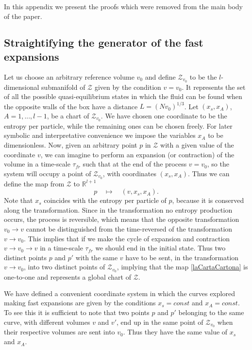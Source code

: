 \documentclass[useAMS,usenatbib,prd,twocolumn,nofootinbib]{revtex4-1}
\begin{document}
In this appendix we present the proofs which were removed from the main body of the paper.

\subsection{Straightifying the generator of the fast expansions}\label{STGOTFE}

Let us choose an arbitrary reference volume $v_0$ and define $\mathcal{Z}_{v_0}$ to be the $l$-dimensional submanifold of $\mathcal{Z}$ given by the condition $v=v_0$. It represents the set of all the possible quasi-equilibrium states in which the fluid can be found when the opposite walls of the box have a distance $L=(Nv_0)^{1/3}$. Let $(x_s,x_A)$, $A=1,...,l-1$, be a chart of $\mathcal{Z}_{v_0}$. We have chosen one coordinate to be the entropy per particle, while the remaining ones can be chosen freely. For later symbolic and interpretative convenience we impose the variables $x_A$ to be dimensionless. 
Now, given an arbitrary point $p$ in $\mathcal{Z}$ with a given value of the coordinate $v$, we can imagine to perform an expansion (or contraction) of the volume in a time-scale $\tau_{fr}$ such that at the end of the process $v=v_0$, so the system will occupy a point of $\mathcal{Z}_{v_0}$, with coordinates $(x_s,x_A)$. Thus we can define the map from $\mathcal{Z}$ to $\mathbb{R}^{l+1}$
\begin{equation}\label{laCartaCartona}
p  \quad \longmapsto \quad  (v,x_s,x_A).
\end{equation}
Note that $x_s$ coincides with the entropy per particle of $p$, because it is conserved along the transformation. Since in the transformation no entropy production occurs, the process is reversible, which means that the opposite transformation $v_0 \rightarrow v$ cannot be distinguished from the time-reversed of the transformation $v \rightarrow v_0$. This implies that if we make the cycle of expansion and contraction $v \rightarrow v_0\rightarrow v$ in a time-scale $\tau_{fr}$ we should end in the initial state. Thus two distinct points $p$ and $p'$ with the same $v$ have to be sent, in the transformation $v \rightarrow v_0$, into two distinct points of $\mathcal{Z}_{v_0}$, implying that the map \eqref{laCartaCartona} is one-to-one and represents a global chart of $\mathcal{Z}$.

We have defined a convenient coordinate system in which the curves explored making fast expansions are given by the conditions $x_s =const$  and $x_{A}=const$. To see this it is sufficient to note that two points $p$ and $p'$ belonging to the same curve, with different volumes $v$ and $v'$, end up in the same point of $\mathcal{Z}_{v_0}$ when their respective volumes are sent into $v_0$. Thus they have the same value of $x_s$ and $x_A$. 
\end{document}
